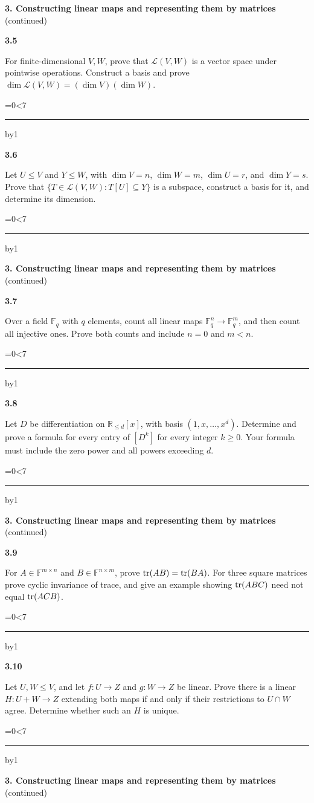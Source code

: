 \documentclass[11pt,letterpaper]{article}
\newcommand{\topicshort}{Problem collection}
\newcommand{\F}{\mathbb F}\newcommand{\R}{\mathbb R}\newcommand{\Q}{\mathbb Q}\newcommand{\C}{\mathbb C}\newcommand{\Z}{\mathbb Z}
\newcommand{\ruled}[1]{\par\begingroup\parskip=0pt\baselineskip=17pt\count255=0\loop\ifnum\count255<#1\noindent\textcolor{black!17}{\rule{\linewidth}{.25pt}}\par\advance\count255 by1\repeat\endgroup}
\newcommand{\problem}[4]{\noindent\begin{minipage}[t][3.48in][t]{\linewidth}\textbf{\color{navy}#1}\quad{\small\sffamily\color{teal}#2#3}\par #4\par\vfill\ruled{7}\end{minipage}}
\begin{document}
\newpage
\renewcommand{\topicshort}{Maps and matrices}
{\large\bfseries\color{navy}3. Constructing linear maps and representing them by matrices} {\small(continued)}\par\vspace{9pt}
\problem{3.5}{M}{ / $\star$}{For finite-dimensional $V,W$, prove that $\mathcal L(V,W)$ is a vector space under pointwise operations. Construct a basis and prove $\dim\mathcal L(V,W)=(\dim V)(\dim W)$.}
\par\vspace{14pt}
\problem{3.6}{M}{}{Let $U\le V$ and $Y\le W$, with $\dim V=n$, $\dim W=m$, $\dim U=r$, and $\dim Y=s$. Prove that $\{T\in\mathcal L(V,W):T[U]\subseteq Y\}$ is a subspace, construct a basis for it, and determine its dimension.}
\newpage
\renewcommand{\topicshort}{Maps and matrices}
{\large\bfseries\color{navy}3. Constructing linear maps and representing them by matrices} {\small(continued)}\par\vspace{9pt}
\problem{3.7}{M}{}{Over a field $\F_q$ with $q$ elements, count all linear maps $\F_q^n\to\F_q^m$, and then count all injective ones. Prove both counts and include $n=0$ and $m<n$.}
\par\vspace{14pt}
\problem{3.8}{M}{}{Let $D$ be differentiation on $\R_{\le d}[x]$, with basis $(1,x,\ldots,x^d)$. Determine and prove a formula for every entry of $[D^k]$ for every integer $k\ge0$. Your formula must include the zero power and all powers exceeding $d$.}
\newpage
\renewcommand{\topicshort}{Maps and matrices}
{\large\bfseries\color{navy}3. Constructing linear maps and representing them by matrices} {\small(continued)}\par\vspace{9pt}
\problem{3.9}{M}{ / $\star$}{For $A\in\F^{m\times n}$ and $B\in\F^{n\times m}$, prove $\operatorname{tr}(AB)=\operatorname{tr}(BA)$. For three square matrices prove cyclic invariance of trace, and give an example showing $\operatorname{tr}(ABC)$ need not equal $\operatorname{tr}(ACB)$.}
\par\vspace{14pt}
\problem{3.10}{M}{}{Let $U,W\le V$, and let $f:U\to Z$ and $g:W\to Z$ be linear. Prove there is a linear $H:U+W\to Z$ extending both maps if and only if their restrictions to $U\cap W$ agree. Determine whether such an $H$ is unique.}
\newpage
\renewcommand{\topicshort}{Maps and matrices}
{\large\bfseries\color{navy}3. Constructing linear maps and representing them by matrices} {\small(continued)}\par\vspace{9pt}
\end{document}

